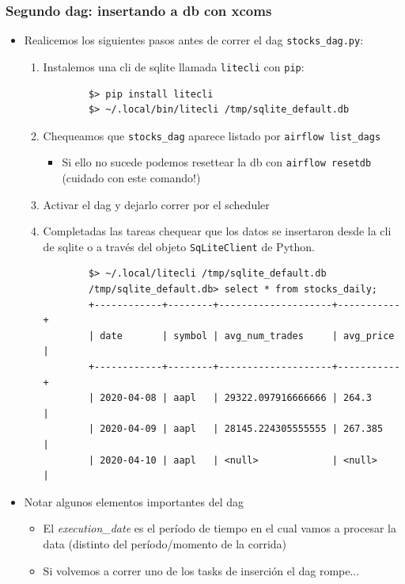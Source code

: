 \documentclass[leqno, 10pt, envcountsect]{beamer}
\numberwithin{equation}{section}
\theoremstyle{definition}
\theoremstyle{example}
\numberwithin{figure}{section}
\numberwithin{table}{section}
\let\olditem\item
\renewcommand{\item}{%
\olditem\vspace{1pt}}
\begin{document}
\begin{frame}[fragile=singleslide]
  \frametitle{Segundo dag: insertando a db con xcoms}
  \begin{itemize}
    \item Realicemos los siguientes pasos antes de correr el dag
      \texttt{stocks_dag.py}:
      \begin{enumerate}
        \item Instalemos una cli de sqlite llamada \texttt{litecli} con \texttt{pip}:
        \begin{verbatim}
        $> pip install litecli
        $> ~/.local/bin/litecli /tmp/sqlite_default.db
        \end{verbatim}
      \item Chequeamos que \texttt{stocks_dag} aparece listado por
        \texttt{airflow list_dags}
        \begin{itemize}
          \item Si ello no sucede podemos resettear la db con \texttt{airflow
            resetdb} (cuidado con este comando!)
        \end{itemize}
      \item Activar el dag y dejarlo correr por el scheduler
      \item Completadas las tareas chequear que los datos se insertaron desde
        la cli de sqlite o a través del objeto \texttt{SqLiteClient} de Python.
        \begin{verbatim}
        $> ~/.local/litecli /tmp/sqlite_default.db
        /tmp/sqlite_default.db> select * from stocks_daily;
        +------------+--------+--------------------+-----------+
        | date       | symbol | avg_num_trades     | avg_price |
        +------------+--------+--------------------+-----------+
        | 2020-04-08 | aapl   | 29322.097916666666 | 264.3     |
        | 2020-04-09 | aapl   | 28145.224305555555 | 267.385   |
        | 2020-04-10 | aapl   | <null>             | <null>    |
        \end{verbatim}
      \end{enumerate}
    \item Notar algunos elementos importantes del dag
      \begin{itemize}
        \item El \textit{execution_date} es el período de tiempo en el cual
          vamos a procesar la data (distinto del período/momento de la corrida)
        \item Si volvemos a correr uno de los tasks de inserción el dag
          rompe...
      \end{itemize}
  \end{itemize}
\end{frame}
\end{document}
